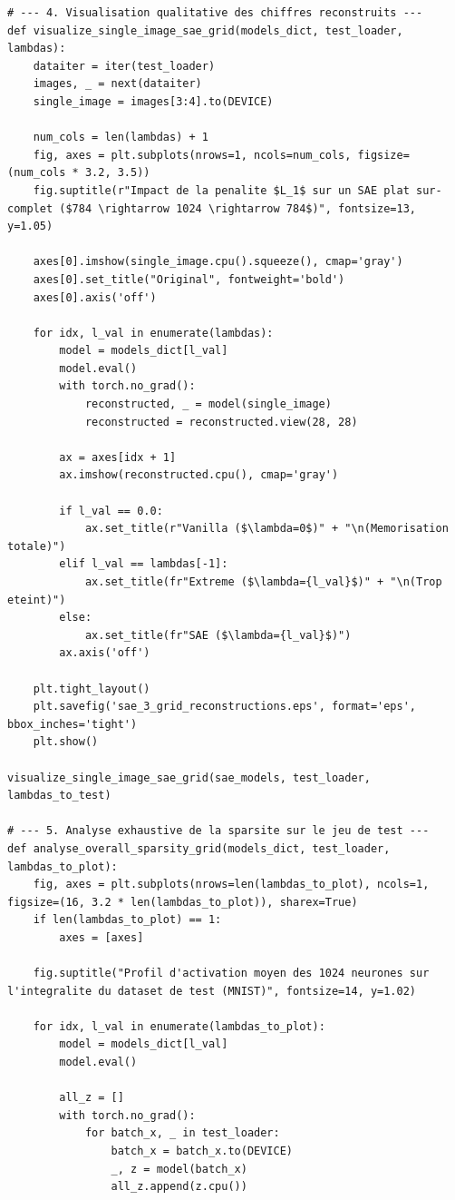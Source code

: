 \documentclass[11pt,a4paper]{report}
\begin{document}
\begin{lstlisting}[caption=Pipeline d'exploration et d'analyse des profils du SAE]
# --- 4. Visualisation qualitative des chiffres reconstruits ---
def visualize_single_image_sae_grid(models_dict, test_loader, lambdas):
    dataiter = iter(test_loader)
    images, _ = next(dataiter)
    single_image = images[3:4].to(DEVICE)
    
    num_cols = len(lambdas) + 1
    fig, axes = plt.subplots(nrows=1, ncols=num_cols, figsize=(num_cols * 3.2, 3.5))
    fig.suptitle(r"Impact de la penalite $L_1$ sur un SAE plat sur-complet ($784 \rightarrow 1024 \rightarrow 784$)", fontsize=13, y=1.05)
    
    axes[0].imshow(single_image.cpu().squeeze(), cmap='gray')
    axes[0].set_title("Original", fontweight='bold')
    axes[0].axis('off')
    
    for idx, l_val in enumerate(lambdas):
        model = models_dict[l_val]
        model.eval()
        with torch.no_grad():
            reconstructed, _ = model(single_image)
            reconstructed = reconstructed.view(28, 28)
            
        ax = axes[idx + 1]
        ax.imshow(reconstructed.cpu(), cmap='gray')
        
        if l_val == 0.0:
            ax.set_title(r"Vanilla ($\lambda=0$)" + "\n(Memorisation totale)")
        elif l_val == lambdas[-1]:
            ax.set_title(fr"Extreme ($\lambda={l_val}$)" + "\n(Trop eteint)")
        else:
            ax.set_title(fr"SAE ($\lambda={l_val}$)")
        ax.axis('off')
        
    plt.tight_layout()
    plt.savefig('sae_3_grid_reconstructions.eps', format='eps', bbox_inches='tight')
    plt.show()

visualize_single_image_sae_grid(sae_models, test_loader, lambdas_to_test)

# --- 5. Analyse exhaustive de la sparsite sur le jeu de test ---
def analyse_overall_sparsity_grid(models_dict, test_loader, lambdas_to_plot):
    fig, axes = plt.subplots(nrows=len(lambdas_to_plot), ncols=1, figsize=(16, 3.2 * len(lambdas_to_plot)), sharex=True)
    if len(lambdas_to_plot) == 1:
        axes = [axes]
        
    fig.suptitle("Profil d'activation moyen des 1024 neurones sur l'integralite du dataset de test (MNIST)", fontsize=14, y=1.02)
    
    for idx, l_val in enumerate(lambdas_to_plot):
        model = models_dict[l_val]
        model.eval()
        
        all_z = []
        with torch.no_grad():
            for batch_x, _ in test_loader:
                batch_x = batch_x.to(DEVICE)
                _, z = model(batch_x)
                all_z.append(z.cpu())
                

\end{lstlisting}
\end{document}
